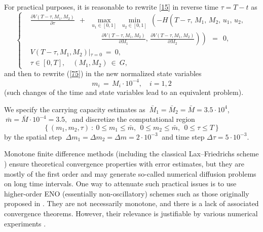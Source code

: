 \documentclass[11pt]{amsart}
\begin{document}
For practical purposes, it is reasonable to rewrite \cref{15} in reverse
time $ \tau = T - t $ as
\begin{equation}
\left\{ \begin{aligned}
& \frac{\partial V(T - \tau, M_1, M_2)}{\partial \tau} \:\: + \:\:
\max_{u_1 \in [0, 1]} \: \min_{u_2 \in [0, 1]} \:
\left( -H \left( T - \tau, \, M_1, \, M_2, \, u_1, \, u_2, 
{}^{{}^{{}^{{}^{{}^{}}}}} \right. \right. \\
& \qquad\qquad\qquad\qquad\qquad
\left. \left. \frac{\partial V(T - \tau, M_1, M_2)}{\partial M_1}, \,
\frac{\partial V(T - \tau, M_1, M_2)}{\partial M_2} \right) \right) \:\: =
\:\: 0, \\
& V(T - \tau, M_1, M_2) \left|_{\tau = 0} \right. \: = \: 0, \\
& \tau \in [0, T], \quad (M_1, M_2) \: \in \: G,
\end{aligned} \right.  \label{75}
\end{equation}
and then to rewrite (\ref{75}) in the new normalized state variables
\begin{equation}
m_i \, = \, M_i \cdot 10^{-4}, \quad i = 1,2  \label{75_1}
\end{equation}
(such changes of the time and state variables lead to an equivalent problem).

We specify the carrying capacity estimates as $ \: \bar{M}_1 = \bar{M}_2 =
\bar{M} = 3.5 \cdot 10^4 $,
$ \: \bar{m} = \bar{M} \cdot 10^{-4} = 3.5, \: $ and 
discretize the computational region %
$$
\left\{ (m_1, m_2, \tau) \: \colon \: 0 \leqslant m_1 \leqslant \bar{m}, \:\: 0
\leqslant m_2 \leqslant \bar{m}, \:\:
0 \leqslant \tau \leqslant T \right\}
$$
by the spatial step $ \: \Delta m_1 = \Delta m_2 = \Delta m = 2 \cdot 10^{-3}
\: $ and time step $ \Delta \tau = 5 \cdot 10^{-3} $.

Monotone finite difference methods %
(including the 
classical Lax--Friedrichs scheme %
) ensure theoretical convergence properties with error estimates, but
they are mostly of the first order and may generate so-called 
numerical diffusion problems %
on long time intervals. One way to attenuate such practical
issues is to use 
higher-order ENO (essentially non-oscillatory) schemes %
such as those originally proposed in \cite{OsherShu1991}. They are not necessarily
monotone, and there is a lack of associated convergence theorems. However,
their relevance is justifiable by various numerical experiments 
\cite{OsherShu1991,BokanForcadelZidani2010}.
\end{document}

